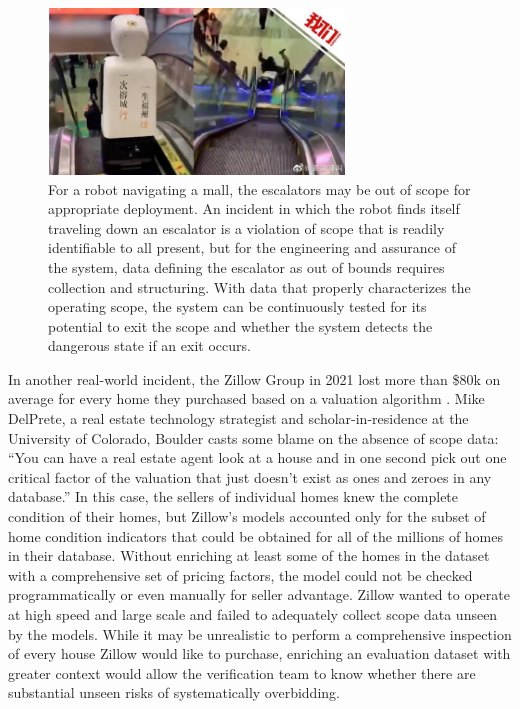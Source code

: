 \begin{figure}[ht]
    \centering
    \includegraphics[width=0.7\textwidth]{images/incidents/escalator-fall.jpeg}
    \caption{For a robot navigating a mall, the escalators may be out of scope for appropriate deployment. An incident \cite{hall_incident_2020} in which the robot finds itself traveling down an escalator is a violation of scope that is readily identifiable to all present, but for the engineering and assurance of the system, data defining the escalator as out of bounds requires collection and structuring. With data that properly characterizes the operating scope, the system can be continuously tested for its potential to exit the scope and whether the system detects the dangerous state if an exit occurs.}
    \label{fig:scope}
\end{figure}

In another real-world incident, the Zillow Group in 2021 lost more than \$80k on average for every home they purchased based on a valuation algorithm \cite{anonymous_incident_2021-1}. Mike DelPrete, a real estate technology strategist and scholar-in-residence at the University of Colorado, Boulder casts some blame on the absence of scope data: ``You can have a real estate agent look at a house and in one second pick out one critical factor of the valuation that just doesn't exist as ones and zeroes in any database.'' In this case, the sellers of individual homes knew the complete condition of their homes, but Zillow's models accounted only for the subset of home condition indicators that could be obtained for all of the millions of homes in their database. Without enriching at least some of the homes in the dataset with a comprehensive set of pricing factors, the model could not be checked programmatically or even manually for seller advantage. Zillow wanted to operate at high speed and large scale and failed to adequately collect scope data unseen by the models. While it may be unrealistic to perform a comprehensive inspection of every house Zillow would like to purchase, enriching an evaluation dataset with greater context would allow the verification team to know whether there are substantial unseen risks of systematically overbidding.

